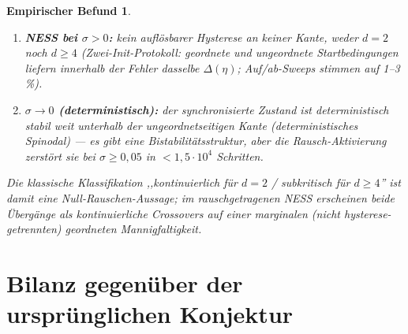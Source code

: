 \documentclass[11pt,a4paper]{article}
\newtheorem{befund}{Empirischer Befund}
\theoremstyle{remark}
\begin{document}
\begin{befund}
\begin{enumerate}
\item \textbf{NESS bei $\sigma>0$:} kein auflösbarer Hysterese an keiner
Kante, weder $d=2$ noch $d\ge4$ (Zwei-Init-Protokoll: geordnete und
ungeordnete Startbedingungen liefern innerhalb der Fehler dasselbe
$\Delta(\eta)$; Auf/ab-Sweeps stimmen auf 1--3\,\%).
\item \textbf{$\sigma\to0$ (deterministisch):} der synchronisierte Zustand
ist deterministisch stabil weit unterhalb der ungeordnetseitigen Kante
(deterministisches Spinodal) --- es gibt eine Bistabilitätsstruktur, aber
die Rausch-Aktivierung zerstört sie bei $\sigma\ge0{,}05$ in
$<1{,}5\cdot10^4$ Schritten.
\end{enumerate}
Die klassische Klassifikation ,,kontinuierlich für $d=2$ / subkritisch
für $d\ge4$'' ist damit eine \emph{Null-Rauschen-Aussage}; im
rauschgetragenen NESS erscheinen beide Übergänge als kontinuierliche
Crossovers auf einer marginalen (nicht hysterese-getrennten) geordneten
Mannigfaltigkeit.
\end{befund}

\section{Bilanz gegenüber der ursprünglichen Konjektur}
\end{document}
